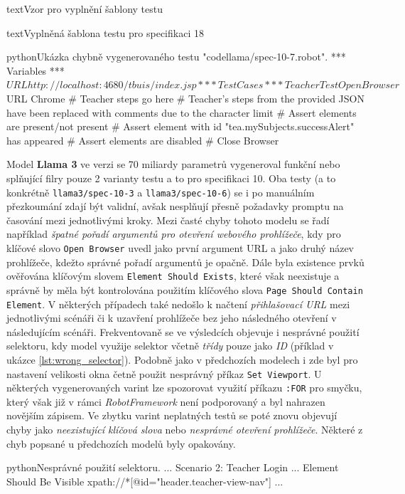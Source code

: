 \documentclass[czech, ma, kiv, he, iso690numb, pdf, viewonly]{fasthesis}
\begin{document}
\begin{code}{text}{Vzor pro vyplnění šablony testu \label{lst:template}}
{\begin{code}{text}{Vyplněná šablona testu pro specifikaci 18 \label{lst:spec18}}
{\begin{code}{python}{Ukázka chybně vygenerovaného testu "codellama/spec-10-7.robot". \label{lst:codellama-comments}}
*** Variables ***
${URL}            http://localhost:4680/tbuis/index.jsp

*** Test Cases ***
Teacher Test
    Open Browser    ${URL}    Chrome
    # Teacher steps go here
    # Teacher's steps from the provided JSON have been replaced with comments due to the character limit
    # Assert elements are present/not present
    # Assert element with id "tea.mySubjects.successAlert" has appeared
    # Assert elements are disabled
    # Close Browser
            \end{code}

            Model \textbf{Llama 3} ve verzi se 70 miliardy parametrů vygeneroval funkční nebo splňující filry pouze 2 varianty testu a to pro specifikaci 10. Oba testy (a to konkrétně \verb|llama3/spec-10-3| a \verb|llama3/spec-10-6|) se i po manuálním přezkoumání zdají být validní, avšak nesplňují přesně požadavky promptu na časování mezi jednotlivými kroky. Mezi časté chyby tohoto modelu se řadí například \textit{špatné pořadí argumentů pro otevření webového prohlížeče}, kdy pro klíčové slovo \verb|Open Browser| uvedl jako první argument URL a jako druhý název prohlížeče, kdežto správné pořadí argumentů je opačně. Dále byla existence prvků ověřována klíčovým slovem \verb|Element Should Exists|, které však neexistuje a správně by měla být kontrolována použitím klíčového slova \verb|Page Should Contain Element|. V některých případech také nedošlo k načtení \textit{přihlašovací URL} mezi jednotlivými scénáři či k uzavření prohlížeče bez jeho následného otevření v následujícím scénáři. Frekventovaně se ve výsledcích objevuje i nesprávné použití selektoru, kdy model využije selektor včetně \textit{třídy} pouze jako \textit{ID} (příklad v ukázce \ref{lst:wrong_selector}). Podobně jako v předchozích modelech i zde byl pro nastavení velikosti okna četně použit nesprávný příkaz \verb|Set Viewport|. U některých vygenerovaných varint lze spozorovat využití příkazu \verb|:FOR| pro smyčku, který však již v rámci \textit{RobotFramework} není podporovaný a byl nahrazen novějším zápisem. Ve zbytku varint neplatných testů se poté znovu objevují chyby jako \textit{neexistující klíčová slova} nebo \textit{nesprávné otevření prohlížeče}. Některé z chyb popsané u předchozích modelů byly opakovány.

            \begin{code}{python}{Nesprávné použití selektoru. \label{lst:wrong_selector}}
                ...
                Scenario 2: Teacher Login
                ...
                Element Should Be Visible    xpath://*[@id="header.teacher-view-nav"]
            ...            \end{code}

}
\end{code}}
\end{code}
\end{document}
